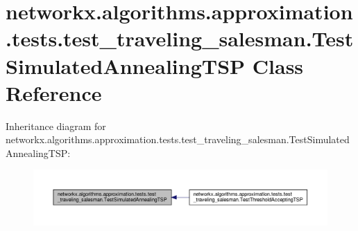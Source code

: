 \hypertarget{classnetworkx_1_1algorithms_1_1approximation_1_1tests_1_1test__traveling__salesman_1_1TestSimulatedAnnealingTSP}{}\section{networkx.\+algorithms.\+approximation.\+tests.\+test\+\_\+traveling\+\_\+salesman.\+Test\+Simulated\+Annealing\+T\+SP Class Reference}
\label{classnetworkx_1_1algorithms_1_1approximation_1_1tests_1_1test__traveling__salesman_1_1TestSimulatedAnnealingTSP}


Inheritance diagram for networkx.\+algorithms.\+approximation.\+tests.\+test\+\_\+traveling\+\_\+salesman.\+Test\+Simulated\+Annealing\+T\+SP\+:
\nopagebreak
\begin{figure}[H]
\begin{center}
\leavevmode
\includegraphics[width=350pt]{classnetworkx_1_1algorithms_1_1approximation_1_1tests_1_1test__traveling__salesman_1_1TestSimulatedAnnealingTSP__inherit__graph}
\end{center}
\end{figure}
